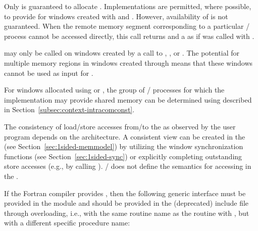 Only  is guaranteed to allocate .
Implementations are permitted, where possible, to provide  for windows created with
 and . However,
availability of  is not guaranteed.
When the remote memory segment corresponding to a particular \MPI/ process cannot be accessed directly,
this call returns  and a  as if 
was called with .

\begin{rationale}
 may only be called on windows created by a call to
, ,
or . The potential for multiple memory regions in windows
created through  means that these windows
cannot be used as input for .
\end{rationale}

\begin{users}
For windows allocated using 
or , the group of \MPI/ processes for which the implementation may provide shared memory can be determined using  described in Section~\ref{subsec:context-intracomconst}.
\end{users}
 
The consistency of load/store accesses from/to the  as
observed by the user program depends on the architecture. A consistent
view can be created in the  (see 
Section~\ref{sec:1sided-memmodel}) by utilizing the window
synchronization functions (see Section~\ref{sec:1sided-sync}) or
explicitly completing outstanding store accesses (e.g., by calling
). \MPI/ does not define the semantics for accessing
 in the .



If the Fortran compiler provides , 
then the following generic interface must be provided in the 
module and should be provided in the (deprecated)  include file through overloading, 
i.e., with the same routine name as the
routine with  , 
but with a different specific procedure name:
 
